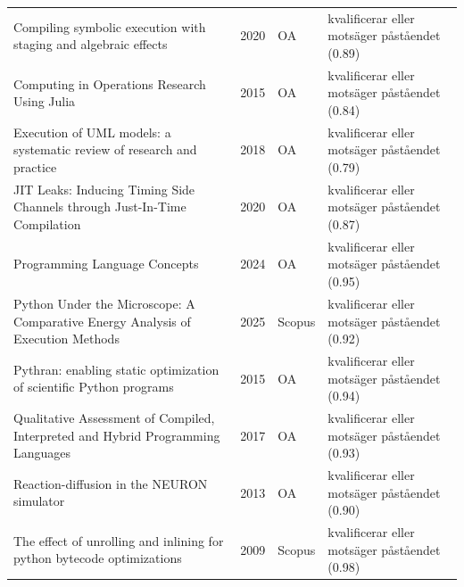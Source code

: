 \begin{longtable}{@{}%
  >{\raggedright\arraybackslash}p{}c%
  >{\raggedright\arraybackslash}p{}%
  >{\raggedright\arraybackslash}p{}@{}}
Compiling symbolic execution with staging and algebraic effects & 2020 & OA & kvalificerar eller motsäger påståendet (0.89) \\
Computing in Operations Research Using Julia & 2015 & OA & kvalificerar eller motsäger påståendet (0.84) \\
Execution of UML models: a systematic review of research and practice & 2018 & OA & kvalificerar eller motsäger påståendet (0.79) \\
JIT Leaks: Inducing Timing Side Channels through Just-In-Time Compilation & 2020 & OA & kvalificerar eller motsäger påståendet (0.87) \\
Programming Language Concepts & 2024 & OA & kvalificerar eller motsäger påståendet (0.95) \\
Python Under the Microscope: A Comparative Energy Analysis of Execution Methods & 2025 & Scopus & kvalificerar eller motsäger påståendet (0.92) \\
Pythran: enabling static optimization of scientific Python programs & 2015 & OA & kvalificerar eller motsäger påståendet (0.94) \\
Qualitative Assessment of Compiled, Interpreted and Hybrid Programming Languages & 2017 & OA & kvalificerar eller motsäger påståendet (0.93) \\
Reaction-diffusion in the NEURON simulator & 2013 & OA & kvalificerar eller motsäger påståendet (0.90) \\
The effect of unrolling and inlining for python bytecode optimizations & 2009 & Scopus & kvalificerar eller motsäger påståendet (0.98) \\
\end{longtable}
\endgroup
